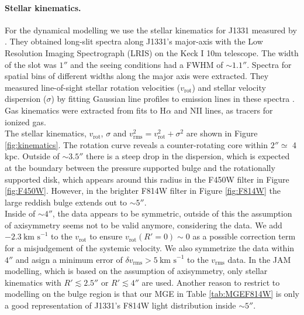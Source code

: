 \paragraph{Stellar kinematics.} For the dynamical modelling we use the stellar kinematics for J1331 measured by \citet{SWELLSV}. They obtained long-slit spectra along J1331's major-axis with the Low Resolution Imaging Spectrograph (LRIS) on the Keck I 10m telescope. The width of the slot was $1''$ and the seeing conditions had a FWHM of $\sim 1.1''$. Spectra for spatial bins of different widths along the major axis were extracted. They measured line-of-sight stellar rotation velocities ($v_\text{rot}$) and stellar velocity dispersion ($\sigma$) by fitting Gaussian line profiles to emission  lines in these spectra . Gas kinematics were extracted from fits to H$\alpha$ and NII lines, as tracers for ionized gas.
\\The stellar kinematics, $v_\text{rot}$, $\sigma$ and $v_\text{rms}^2=v_\text{rot}^2 + \sigma^2$ are shown in Figure \ref{fig:kinematics}. The rotation curve reveals a counter-rotating core within $2''\simeq$ 4 kpc. Outside of $\sim 3.5''$ there is a steep drop in the dispersion, which is expected at the boundary between the pressure supported bulge and the rotationally supported disk, which appears around this radius in the F450W filter in Figure \ref{fig:F450W}. However, in the brighter F814W filter in Figure \ref{fig:F814W}  the large reddish bulge extends out to $\sim5''$. 
\\Inside of $\sim 4''$, the data appears to be symmetric, outside of this the assumption of axisymmetry seems not to be valid anymore, considering the data. We add $-2.3~\text{km s}^{-1}$ to the $v_\text{rot}$ to ensure $v_\text{rot}(R'=0) \sim 0$ as a possible correction term for a misjudgement of the systemic velocity. We also symmetrize the data within $4''$ and asign a minimum error of $\delta v_\text{rms} > 5~\text{km s}^{-1}$ to the $v_\text{rms}$ data. In the JAM modelling, which is based on the assumption of axisymmetry, only stellar kinematics with $R'  \lesssim 2.5''$ or $R' \lesssim 4''$ are used. Another reason to restrict to modelling on the bulge region is that our MGE in Table \ref{tab:MGEF814W} is only a good representation of J1331's F814W light distribution inside $\sim 5''$.

